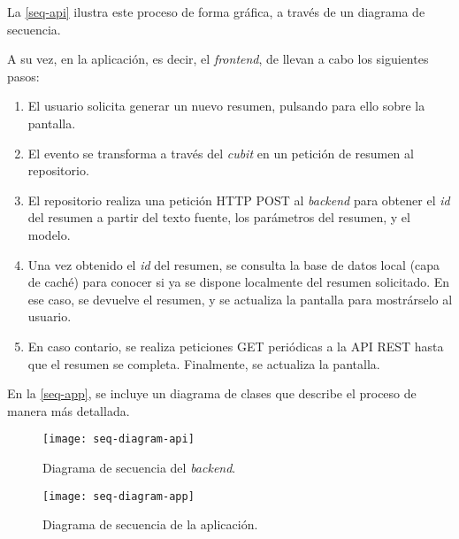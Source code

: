 La \autoref{seq-api} ilustra este proceso de forma gráfica, a través de un diagrama de secuencia.

A su vez, en la aplicación, es decir, el \emph{frontend}, de llevan a cabo los siguientes pasos:

\begin{enumerate}
	\item El usuario solicita generar un nuevo resumen, pulsando para ello sobre la pantalla.
	
	\item El evento se transforma a través del \emph{cubit} en un petición de resumen al repositorio.
	
	\item El repositorio realiza una petición HTTP POST al \emph{backend} para obtener el \emph{id} del resumen a partir del texto fuente, los parámetros del resumen, y el modelo.
	
	\item Una vez obtenido el \emph{id} del resumen, se consulta la base de datos local (capa de caché) para conocer si ya se dispone localmente del resumen solicitado. En ese caso, se devuelve el resumen, y se actualiza la pantalla para mostrárselo al usuario.
	
	\item En caso contario, se realiza peticiones GET periódicas a la API REST hasta que el resumen se completa. Finalmente, se actualiza la pantalla.
\end{enumerate}

En la \autoref{seq-app}, se incluye un diagrama de clases que describe el proceso de manera más detallada.

\vspace{1cm}

\begin{figure}[h]
	\centering
	\texttt{[image: seq-diagram-api]}
	\caption{Diagrama de secuencia del \emph{backend}.}
	\label{seq-api}
\end{figure}

\vspace*{1cm}

\begin{landscape}
	\begin{figure}[h]
		\centering
		\texttt{[image: seq-diagram-app]}
		\caption{Diagrama de secuencia de la aplicación.}
		\label{seq-app}
	\end{figure}
\end{landscape}

